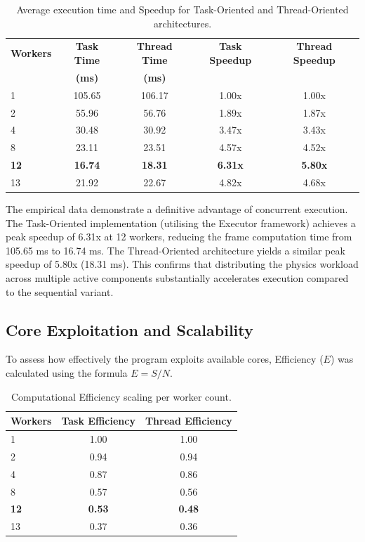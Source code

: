 \documentclass{scrartcl}
\begin{document}
\begin{table}[H]
    \centering
    \begin{tabular}{@{}lcccc@{}}
        \toprule
        \textbf{Workers} & \textbf{Task Time} & \textbf{Thread Time} & \textbf{Task Speedup} & \textbf{Thread Speedup} \\
        & \textbf{(ms)} & \textbf{(ms)} \\ \midrule
        1 & 105.65 & 106.17 & 1.00x & 1.00x \\
        2 & 55.96 & 56.76 & 1.89x & 1.87x \\
        4 & 30.48 & 30.92 & 3.47x & 3.43x \\
        8 & 23.11 & 23.51 & 4.57x & 4.52x \\
        \textbf{12} & \textbf{16.74} & \textbf{18.31} & \textbf{6.31x} & \textbf{5.80x} \\
        13 & 21.92 & 22.67 & 4.82x & 4.68x \\ \bottomrule
    \end{tabular}
    \caption{Average execution time and Speedup for Task-Oriented and Thread-Oriented architectures.}
    \label{tab:speedup}
\end{table}

The empirical data demonstrate a definitive advantage of concurrent execution. The Task-Oriented implementation (utilising the Executor framework) achieves a peak speedup of 6.31x at 12 workers, reducing the frame computation time from 105.65 ms to 16.74 ms. The Thread-Oriented architecture yields a similar peak speedup of 5.80x (18.31 ms). This confirms that distributing the physics workload across multiple active components substantially accelerates execution compared to the sequential variant.

\subsection{Core Exploitation and Scalability}
To assess how effectively the program exploits available cores, Efficiency ($E$) was calculated using the formula $E = S / N$.

\begin{table}[H]
    \centering
    \begin{tabular}{@{}lcc@{}}
        \toprule
        \textbf{Workers} & \textbf{Task Efficiency} & \textbf{Thread Efficiency} \\ \midrule
        1 & 1.00 & 1.00 \\
        2 & 0.94 & 0.94 \\
        4 & 0.87 & 0.86 \\
        8 & 0.57 & 0.56 \\
        \textbf{12} & \textbf{0.53} & \textbf{0.48} \\
        13 & 0.37 & 0.36 \\ \bottomrule
    \end{tabular}
    \caption{Computational Efficiency scaling per worker count.}
    \label{tab:efficiency}
\end{table}
\end{document}
